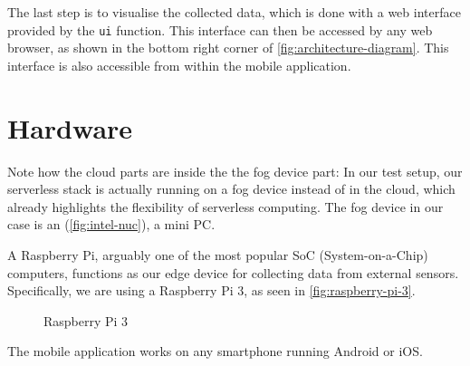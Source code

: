 The last step is to visualise the collected data, which is done with a web interface provided by the
\texttt{ui} function. This interface can then be accessed by any web browser, as shown in the bottom
right corner of \autoref{fig:architecture-diagram}. This interface is also accessible from within
the mobile application.

\section{Hardware}

Note how the cloud parts are inside the the fog device part: In our test setup, our serverless stack
is actually running on a fog device instead of in the cloud, which already highlights the
flexibility of serverless computing. The fog device in our case is an 
(\autoref{fig:intel-nuc}), a mini PC.

\begin{figure}[H]
  \centering
  \caption{}
  \label{fig:intel-nuc}
\end{figure}

A Raspberry Pi, arguably one of the most popular SoC (System-on-a-Chip) computers, functions as our
edge device for collecting data from external sensors. Specifically, we are using a Raspberry Pi 3,
as seen in \autoref{fig:raspberry-pi-3}.

\begin{figure}[H]
  \centering
  \caption{Raspberry Pi 3}
  \label{fig:raspberry-pi-3}
\end{figure}

The mobile application works on any smartphone running Android or iOS.
